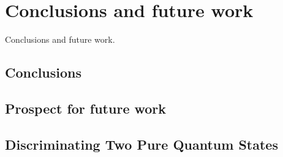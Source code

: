 \chapter{Conclusions and future work}\label{ch:future_work}
Conclusions and future work.

\section{Conclusions}

\section{Prospect for future work}
		\section{Discriminating Two Pure Quantum States}

